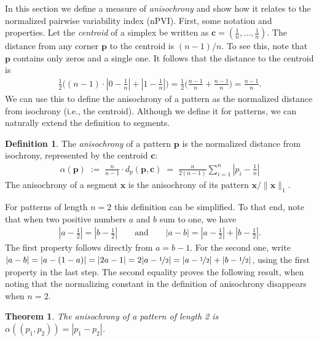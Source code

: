 \documentclass[a4paper]{article}
\newcommand{\vect}[1]{\mathbf{#1}}
\newcommand{\vx}{\vect x}
\newcommand{\vp}{\vect p}
\newcommand{\vc}{\vect c}
\newtheorem{theorem}{Theorem}
\theoremstyle{definition}
\newtheorem{definition}{Definition}
\begin{document}
In this section we define a measure of \emph{anisochrony} and show how it relates to the normalized pairwise variability index (nPVI).
First, some notation and properties.
Let the \emph{centroid} of a simplex be written as $\vc = (\tfrac{1}{n}, \dots, \tfrac{1}{n})$.
The distance from any corner $\vp$ to the centroid is $(n-1)/n$. To see this, note that $\vp$ contains only zeros and a single one. It follows that the distance to the centroid is
\begin{align}
  \tfrac{1}{2}\Big((n-1) \cdot |0 - \tfrac{1}{n}| +
  |1-\tfrac{1}{n}|\Big)
  = \tfrac{1}{2}\Big(\frac{n-1}{n} + \frac{n-1}{n}\Big)
  = \frac{n-1}{n}.
\end{align}
We can use this to define the anisochrony of a pattern as the normalized distance from isochrony (i.e., the centroid). Although we define it for patterns, we can naturally extend the definition to segments.


\begin{definition}
  The \emph{anisochrony} of a pattern $\vp$ is the normalized distance from isochrony, represented by the centroid $\vc$:
  \begin{align}
    \alpha(\vp)
    \; := \; \frac{n}{n-1} \cdot d_p(\vp, \vc)
    \; = \; \frac{n}{2(n-1)} \sum_{i=1}^n |p_i - \tfrac{1}{n}|
  \end{align}
  The anisochrony of a segment $\vx$ is the anisochrony of its pattern $\vx / \|\vx\|_1$.
\end{definition}



For patterns of length $n=2$ this definition can be simplified.
To that end, note that when two positive numbers $a$ and $b$ sum to one, we have
\begin{align}
  |a-\tfrac{1}{2}| = |b-\tfrac{1}{2}|
  \qquad \text{and} \qquad
  |a-b|
  = |a-\tfrac{1}{2}| + |b-\tfrac{1}{2}|.
\end{align}
The first property follows directly from $a=b-1$. For the second one, write
$|a-b|
  = |a-(1-a)|
  = |2a-1|
  = 2|a-\nicefrac{1}{2}|
  = |a-\nicefrac{1}{2}| + |b-\nicefrac{1}{2}|
$,
using the first property in the last step.
The second equality proves the following result, when noting that the normalizing constant in the definition of anisochrony disappears when $n=2$.

\begin{theorem}\label{thm:2-anisochrony}
  The anisochrony of a pattern of length 2 is $\alpha((p_1, p_2)) = |p_1 - p_2|$.
\end{theorem}
\end{document}
